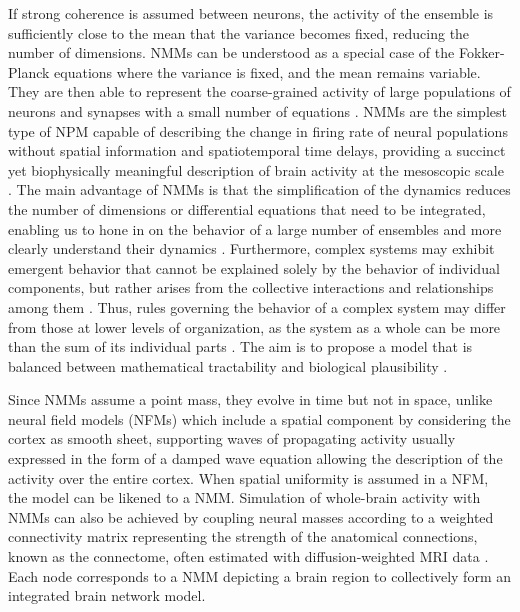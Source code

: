 \documentclass[12pt,twoside]{article}
\begin{document}
If strong coherence is assumed between neurons, the activity of the ensemble is sufficiently close to the mean that the variance becomes fixed, reducing the number of dimensions. NMMs can be understood as a special case of the Fokker-Planck equations where the variance is fixed, and the mean remains variable. They are then able to represent the coarse-grained activity of large populations of neurons and synapses with a small number of equations \citep{jansen1995electroencephalogram, lopes1974model, breakspear2017dynamic}. NMMs are the simplest type of NPM capable of describing the change in firing rate of neural populations without spatial information and spatiotemporal time delays, providing a succinct yet biophysically meaningful description of brain activity at the mesoscopic scale \citep{spiegler2012dynamics, cook2021neural}. The main advantage of NMMs is that the simplification of the dynamics reduces the number of dimensions or differential equations that need to be integrated, enabling us to hone in on the behavior of a large number of ensembles and more clearly understand their dynamics \citep{deco2008dynamic}. Furthermore, complex systems may exhibit emergent behavior that cannot be explained solely by the behavior of individual components, but rather arises from the collective interactions and relationships among them \citep{breakspear2017dynamic}. Thus, rules governing the behavior of a complex system may differ from those at lower levels of organization, as the system as a whole can be more than the sum of its individual parts \citep{moran2011vivo}. The aim is to propose a model that is balanced between mathematical tractability and biological plausibility \citep{spiegler2012dynamics}.

Since NMMs assume a point mass, they evolve in time but not in space, unlike neural field models (NFMs) which include a spatial component by considering the cortex as smooth sheet, supporting waves of propagating activity \citep{pinotsis2014neural, breakspear2017dynamic} usually expressed in the form of a damped wave equation allowing the description of the activity over the entire cortex. When spatial uniformity is assumed in a NFM, the model can be likened to a NMM. Simulation of whole-brain activity with NMMs can also be achieved by coupling neural masses according to a weighted connectivity matrix representing the strength of the anatomical connections, known as the connectome, often estimated with diffusion-weighted MRI data \citep{breakspear2017dynamic, schirner2018inferring, glomb2021computational}. Each node corresponds to a NMM depicting a brain region to collectively form an integrated brain network model. 
\end{document}
